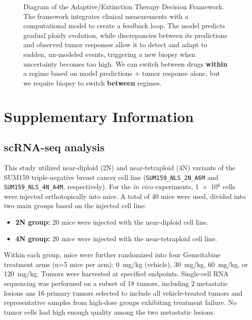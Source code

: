 \documentclass{article}
\begin{document}
\begin{figure}[h!]
{
}
\caption{Diagram of the Adaptive/Extinction Therapy Decision Framework. The framework integrates clinical measurements with a computational model to create a feedback loop. The model predicts gradual ploidy evolution, while discrepancies between its predictions and observed tumor responses allow it to detect and adapt to sudden, un-modeled events, triggering a new biopsy when uncertainty becomes too high. \color{blue} We can switch between drugs \textbf{within} a regime based on model predictions + tumor response alone, but we require biopsy to switch \textbf{between} regimes.}
\label{fig:framework_diagram}
\end{figure}












\section{Supplementary Information}

\subsection{scRNA-seq analysis}

This study utilized near-diploid (2N) and near-tetraploid (4N) variants of the SUM159 triple-negative breast cancer cell line (\texttt{SUM159\_NLS\_2N\_A6M} and \texttt{SUM159\_NLS\_4N\_A4M}, respectively). For the \textit{in vivo} experiments, 1~$\times$~10$^6$ cells were injected orthotopically into mice. A total of 40 mice were used, divided into two main groups based on the injected cell line:
\begin{itemize}
    \item \textbf{2N group:} 20 mice were injected with the near-diploid cell line.
    \item \textbf{4N group:} 20 mice were injected with the near-tetraploid cell line.
\end{itemize}
Within each group, mice were further randomized into four Gemcitabine treatment arms (n=5 mice per arm): 0~mg/kg (vehicle), 30~mg/kg, 60~mg/kg, or 120~mg/kg. Tumors were harvested at specified endpoints. Single-cell RNA sequencing was performed on a subset of 18 tumors, including 2 metastatic lesions ans 16 primary tumors selected to include all vehicle-treated tumors and representative samples from high-dose groups exhibiting treatment failure. No tumor cells had high enough quality among the two metastatic lesions.
\end{document}

